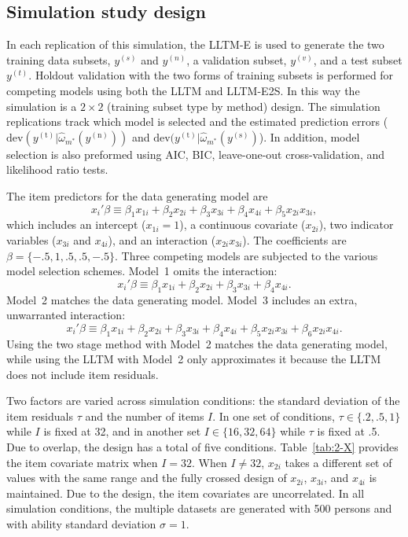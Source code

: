 \subsection{Simulation study design}

In each replication of this simulation, the LLTM-E is used to generate the two training data subsets, $y^{(s)}$ and $y^{(n)}$, a validation subset, $y^{(v)}$, and a test subset $y^{(t)}$. Holdout validation with the two forms of training subsets is performed for competing models using both the LLTM and LLTM-E2S. In this way the simulation is a $2 \times 2$ (training subset type by method) design. 
The simulation replications track which model is selected and the estimated prediction errors 
	($\mathrm{dev}(y^{(\mathrm{t})} | \hat \omega_{m^*}(y^{(\mathrm{n})}))$ and
	$\mathrm{dev}(y^{(\mathrm{t})} | \hat \omega_{m^*}(y^{(\mathrm{s})})$).
In addition, model selection is also preformed using AIC, BIC, leave-one-out cross-validation, and likelihood ratio tests.

The item predictors for the data generating model are
\begin{equation} 
	x_i'\beta \equiv \beta_1 x_{1i} + \beta_2 x_{2i} + \beta_3 x_{3i} + \beta_4 x_{4i} + 
		\beta_5 x_{2i} x_{3i}
,\end{equation}
which includes an intercept ($x_{1i} = 1$), a continuous covariate ($x_{2i}$), two indicator variables ($x_{3i}$ and $x_{4i}$), and an interaction ($x_{2i} x_{3i}$). The coefficients are 
$\beta = \{-.5, 1, .5, .5, -.5\}$. Three competing models are subjected to the various model selection schemes. Model~1 omits the interaction:
\begin{equation} 
	x_i'\beta \equiv \beta_1 x_{1i} + \beta_2 x_{2i} + \beta_3 x_{3i} + \beta_4 x_{4i}
.\end{equation}
Model~2 matches the data generating model.
Model~3 includes an extra, unwarranted interaction:
\begin{equation} 
	x_i'\beta \equiv \beta_1 x_{1i} + \beta_2 x_{2i} + \beta_3 x_{3i} + \beta_4 x_{4i} + 
		\beta_5 x_{2i} x_{3i} + \beta_6 x_{2i} x_{4i}
.\end{equation}
Using the two stage method with Model~2 matches the data generating model, while using the LLTM with Model~2 only approximates it because the LLTM does not include item residuals.

Two factors are varied across simulation conditions: the standard deviation of the item residuals $\tau$ and the number of items $I$. In one set of conditions, 
$\tau \in \{.2, .5, 1\}$ while $I$ is fixed at 32, 
and in another set 
$I \in \{16, 32, 64\}$ while $\tau$ is fixed at .5.
Due to overlap, the design has a total of five conditions. Table~\ref{tab:2-X} provides the item covariate matrix when $I=32$. When $I \ne 32$, $x_{2i}$ takes a different set of values with the same range and the fully crossed design of $x_{2i}$, $x_{3i}$, and $x_{4i}$ is maintained. Due to the design, the item covariates are uncorrelated. In all simulation conditions, the multiple datasets are generated with 500 persons and with ability standard deviation $\sigma = 1$.

